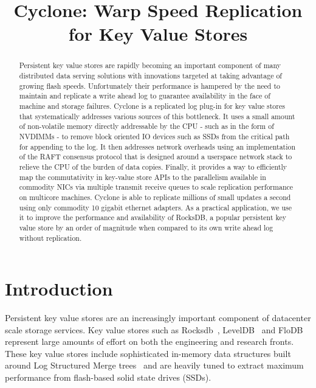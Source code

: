 \documentclass[pageno]{jpaper}
\begin{document}
\title{\Large \bf Cyclone: Warp Speed Replication for Key Value Stores}


\date{}
\maketitle

\thispagestyle{empty}

\begin{abstract}
Persistent key value stores are rapidly becoming an important component of many
distributed data serving solutions with innovations targeted at taking advantage
of growing flash speeds. Unfortunately their performance is hampered by the need
to maintain and replicate a write ahead log to guarantee availability in the
face of machine and storage failures. Cyclone is a replicated log plug-in for
key value stores that systematically addresses various sources of this
bottleneck. It uses a small amount of non-volatile memory directly addressable
by the CPU - such as in the form of NVDIMMs - to remove block oriented IO
devices such as SSDs from the critical path for appending to the log. It then
addresses network overheads using an implementation of the RAFT consensus
protocol that is designed around a userspace network stack to relieve the CPU of
the burden of data copies. Finally, it provides a way to efficiently map the
commutativity in key-value store APIs to the parallelism available in commodity
NICs via multiple transmit receive queues to scale replication performance on
multicore machines. Cyclone is able to replicate millions of small updates a
second using only commodity 10 gigabit ethernet adapters. As a practical
application, we use it to improve the performance and availability of RocksDB, a
popular persistent key value store by an order of magnitude when compared to its
own write ahead log without replication.
\end{abstract}

\section{Introduction}
Persistent key value stores are an increasingly important component of
datacenter scale storage services. Key value stores such as
Rocksdb~\cite{rocksdb}, LevelDB~\cite{leveldb} and FloDB~\cite{flodb} represent
large amounts of effort on both the engineering and research fronts. These key
value stores include sophisticated in-memory data structures built around Log
Structured Merge trees~\cite{lsmtree} and are heavily tuned to extract maximum
performance from flash-based solid state drives (SSDs).
\end{document}
